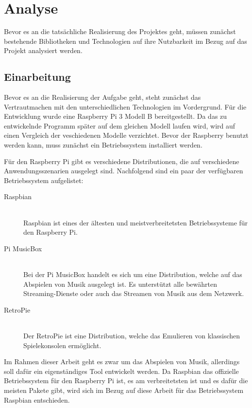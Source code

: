 
\chapter{Analyse}
Bevor es an die tatsächliche Realisierung des Projektes geht, müssen zunächst
bestehende Bibliotheken und Technologien auf ihre Nutzbarkeit im Bezug auf das
Projekt analysiert werden. 


\section{Einarbeitung}
Bevor es an die Realisierung der Aufgabe geht, steht zunächst das
Vertrautmachen mit den unterschiedlichen Technologien im Vordergrund. Für die
Entwicklung wurde eine Raspberry Pi 3 Modell B bereitgestellt. Da das zu
entwickelnde Programm später auf dem gleichen Modell laufen wird, wird auf
einen Vergleich der veschiedenen Modelle verzichtet. Bevor der Raspberry
benutzt werden kann, muss zunächst ein Betriebssystem installiert werden.
\hfill \break

Für den Raspberry Pi gibt es verschiedene Distributionen, die auf verschiedene
Anwendungsszenarien ausgelegt sind. Nachfolgend sind ein paar der verfügbaren
Betriebssystem aufgelistet: 
\begin{description}
\item[Raspbian] \hfill \\ 
    Raspbian ist eines der ältesten und meistverbreitetsten Betriebssysteme für
    den Raspberry Pi. 
\item[Pi MusicBox] \hfill \\ 
    Bei der Pi MusicBox handelt es sich um eine Distribution, welche auf das
    Abspielen von Musik ausgelegt ist. Es unterstützt alle bewährten
    Streaming-Dienste oder auch das Streamen von Musik aus dem Netzwerk.
\item[RetroPie] \hfill \\
    Der RetroPie ist eine Distribution, welche das Emulieren von klassischen
    Spielekonsolen ermöglicht.
\end{description}

Im Rahmen dieser Arbeit geht es zwar um das Abspielen von Musik, allerdings
soll dafür ein eigenständiges Tool entwickelt werden. Da Raspbian das
offizielle Betriebssystem für den Raspberry Pi ist, es am verbreitetsten ist
und es dafür die meisten Pakete gibt, wird sich im Bezug auf diese Arbeit für
das Betriebssystem Raspbian entschieden. \hfill \break

